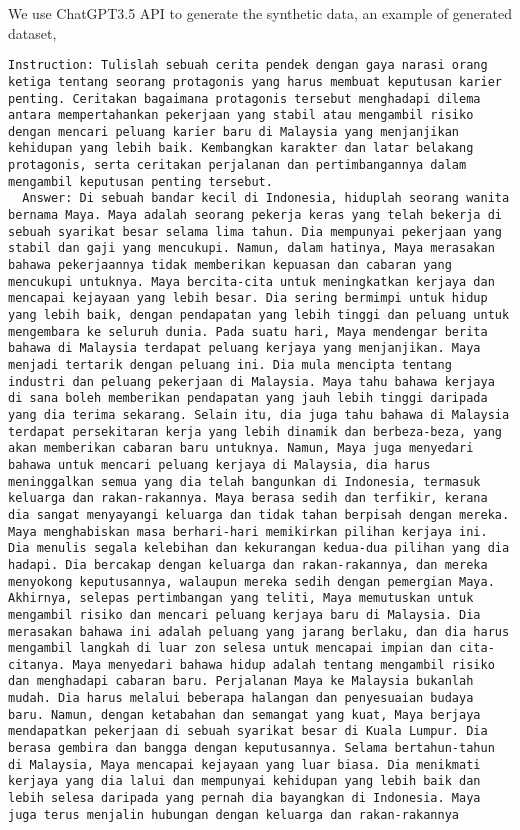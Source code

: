 \documentclass{article}
\begin{document}
We use ChatGPT3.5 API to generate the synthetic data, an example of generated dataset,

\begin{lstlisting}[breaklines=true]
  Instruction: Tulislah sebuah cerita pendek dengan gaya narasi orang ketiga tentang seorang protagonis yang harus membuat keputusan karier penting. Ceritakan bagaimana protagonis tersebut menghadapi dilema antara mempertahankan pekerjaan yang stabil atau mengambil risiko dengan mencari peluang karier baru di Malaysia yang menjanjikan kehidupan yang lebih baik. Kembangkan karakter dan latar belakang protagonis, serta ceritakan perjalanan dan pertimbangannya dalam mengambil keputusan penting tersebut.
  Answer: Di sebuah bandar kecil di Indonesia, hiduplah seorang wanita bernama Maya. Maya adalah seorang pekerja keras yang telah bekerja di sebuah syarikat besar selama lima tahun. Dia mempunyai pekerjaan yang stabil dan gaji yang mencukupi. Namun, dalam hatinya, Maya merasakan bahawa pekerjaannya tidak memberikan kepuasan dan cabaran yang mencukupi untuknya. Maya bercita-cita untuk meningkatkan kerjaya dan mencapai kejayaan yang lebih besar. Dia sering bermimpi untuk hidup yang lebih baik, dengan pendapatan yang lebih tinggi dan peluang untuk mengembara ke seluruh dunia. Pada suatu hari, Maya mendengar berita bahawa di Malaysia terdapat peluang kerjaya yang menjanjikan. Maya menjadi tertarik dengan peluang ini. Dia mula mencipta tentang industri dan peluang pekerjaan di Malaysia. Maya tahu bahawa kerjaya di sana boleh memberikan pendapatan yang jauh lebih tinggi daripada yang dia terima sekarang. Selain itu, dia juga tahu bahawa di Malaysia terdapat persekitaran kerja yang lebih dinamik dan berbeza-beza, yang akan memberikan cabaran baru untuknya. Namun, Maya juga menyedari bahawa untuk mencari peluang kerjaya di Malaysia, dia harus meninggalkan semua yang dia telah bangunkan di Indonesia, termasuk keluarga dan rakan-rakannya. Maya berasa sedih dan terfikir, kerana dia sangat menyayangi keluarga dan tidak tahan berpisah dengan mereka. Maya menghabiskan masa berhari-hari memikirkan pilihan kerjaya ini. Dia menulis segala kelebihan dan kekurangan kedua-dua pilihan yang dia hadapi. Dia bercakap dengan keluarga dan rakan-rakannya, dan mereka menyokong keputusannya, walaupun mereka sedih dengan pemergian Maya. Akhirnya, selepas pertimbangan yang teliti, Maya memutuskan untuk mengambil risiko dan mencari peluang kerjaya baru di Malaysia. Dia merasakan bahawa ini adalah peluang yang jarang berlaku, dan dia harus mengambil langkah di luar zon selesa untuk mencapai impian dan cita-citanya. Maya menyedari bahawa hidup adalah tentang mengambil risiko dan menghadapi cabaran baru. Perjalanan Maya ke Malaysia bukanlah mudah. Dia harus melalui beberapa halangan dan penyesuaian budaya baru. Namun, dengan ketabahan dan semangat yang kuat, Maya berjaya mendapatkan pekerjaan di sebuah syarikat besar di Kuala Lumpur. Dia berasa gembira dan bangga dengan keputusannya. Selama bertahun-tahun di Malaysia, Maya mencapai kejayaan yang luar biasa. Dia menikmati kerjaya yang dia lalui dan mempunyai kehidupan yang lebih baik dan lebih selesa daripada yang pernah dia bayangkan di Indonesia. Maya juga terus menjalin hubungan dengan keluarga dan rakan-rakannya 
\end{lstlisting}
\end{document}
